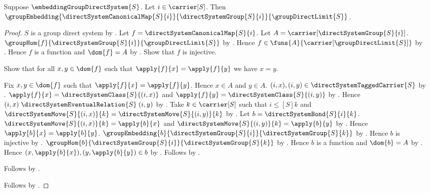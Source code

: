 \begin{theorem}\label{embedding_system_canonical_map_embedding}
    Suppose $\embeddingGroupDirectSystem{S}$.
    Let $i\in\carrier[S]$.
    Then $\groupEmbedding
        {\directSystemCanonicalMap{S}{i}}
        {\directSystemGroup{S}{i}}{\groupDirectLimit{S}}$.
\end{theorem}
\begin{proof}
    $S$ is a group direct system by
        .
    Let $f=\directSystemCanonicalMap{S}{i}$.
    Let $A=\carrier[\directSystemGroup{S}{i}]$.
    $\groupHom{f}{\directSystemGroup{S}{i}}{\groupDirectLimit{S}}$ by
        .
    Hence $f\in\funs{A}{\carrier[\groupDirectLimit{S}]}$ by
        .
    Hence $f$ is a function and $\dom{f}=A$ by
        .
    Show that $f$ is injective.
    \begin{subproof}
        Show that for all $x,y\in\dom{f}$ such that
            $\apply{f}{x}=\apply{f}{y}$ we have $x=y$.
        \begin{subproof}
            Fix $x,y\in\dom{f}$ such that $\apply{f}{x}=\apply{f}{y}$.
            Hence $x\in A$ and $y\in A$.
            $(i,x),(i,y)\in\directSystemTaggedCarrier{S}$ by
                .
            $\apply{f}{x}=\directSystemClass{S}{(i,x)}$ and
                $\apply{f}{y}=\directSystemClass{S}{(i,y)}$ by
                .
            Hence $(i,x)\mathrel{\directSystemEventualRelation{S}}(i,y)$ by
                .
            Take $k\in\carrier[S]$ such that
                $i\mathrel{\leq[S]}k$ and
                $\directSystemMove{S}{(i,x)}{k}
                    =\directSystemMove{S}{(i,y)}{k}$ by
                .
            Let $b=\directSystemBond{S}{i}{k}$.
            $\directSystemMove{S}{(i,x)}{k}=\apply{b}{x}$ and
                $\directSystemMove{S}{(i,y)}{k}=\apply{b}{y}$ by
                .
            Hence $\apply{b}{x}=\apply{b}{y}$.
            $\groupEmbedding{b}
                {\directSystemGroup{S}{i}}
                {\directSystemGroup{S}{k}}$ by
                .
            Hence $b$ is injective by
                .
            $\groupHom{b}
                {\directSystemGroup{S}{i}}
                {\directSystemGroup{S}{k}}$ by
                .
            Hence $b$ is a function and $\dom{b}=A$ by
                .
            Hence $(x,\apply{b}{x}),(y,\apply{b}{y})\in b$ by
                .
            Follows by .
        \end{subproof}
        Follows by .
    \end{subproof}
    Follows by .
\end{proof}
